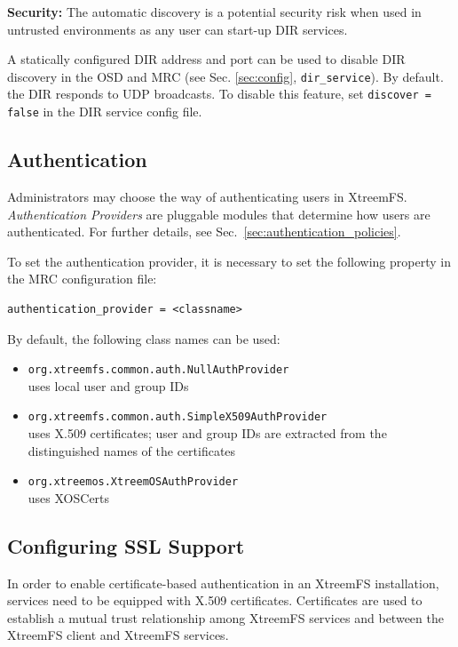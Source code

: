 \documentclass[a4paper,10pt]{book}
\begin{document}
\textbf{Security:} The automatic discovery is a potential security risk when used in untrusted environments as any user can start-up DIR services.

A statically configured DIR address and port can be used to disable DIR discovery in the OSD and MRC (see Sec. \ref{sec:config}, \texttt{dir\_service}). By default. the DIR responds to UDP broadcasts. To disable this feature, set  \texttt{discover = false} in the DIR service config file.


\subsection{Authentication}
\label{sec:AuthProvider}
Administrators may choose the way of authenticating users in XtreemFS. \emph{Authentication Providers} are pluggable modules that determine how users are authenticated. For further details, see Sec.\ \ref{sec:authentication_policies}.

To set the authentication provider, it is necessary to set the following property in the MRC configuration file:

\begin{verbatim}
authentication_provider = <classname>
\end{verbatim}

By default, the following class names can be used:

\begin{itemize}
 \item \texttt{org.xtreemfs.common.auth.NullAuthProvider}\\
uses local user and group IDs
 \item \texttt{org.xtreemfs.common.auth.SimpleX509AuthProvider}\\
uses X.509 certificates; user and group IDs are extracted from the distinguished names of the certificates
 \item \texttt{org.xtreemos.XtreemOSAuthProvider}\\
uses XOSCerts
\end{itemize}


\subsection{Configuring SSL Support}
\label{sec:cfg_ssl}

In order to enable certificate-based authentication in an XtreemFS installation, services need to be equipped with X.509 certificates. Certificates are used to establish a mutual trust relationship among XtreemFS services and between the XtreemFS client and XtreemFS services.
\end{document}
